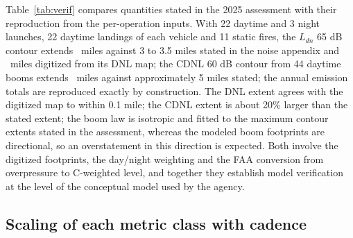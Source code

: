 \documentclass[preprint,12pt,authoryear]{elsarticle}
\begin{document}
Table~\ref{tab:verif} compares quantities stated in the 2025 assessment with their reproduction from the per-operation inputs. With 22 daytime and 3 night launches, 22 daytime landings of each vehicle and 11 static fires, the $L_{dn}$ 65 dB contour extends \valVerifDnlSixFiveDbContourExtentMiles~miles against 3 to 3.5 miles stated in the noise appendix and \valVerifDnlSixFiveDbOverlandContourRadiusDigitizedFigureTwoOneMiles~miles digitized from its DNL map; the CDNL 60 dB contour from 44 daytime booms extends \valVerifCdnlSixZeroDbContourExtentMiles~miles against approximately 5 miles stated; the annual emission totals are reproduced exactly by construction. The DNL extent agrees with the digitized map to within 0.1 mile; the CDNL extent is about 20\% larger than the stated extent; the boom law is isotropic and fitted to the maximum contour extents stated in the assessment, whereas the modeled boom footprints are directional, so an overstatement in this direction is expected. Both involve the digitized footprints, the day/night weighting and the FAA conversion from overpressure to C-weighted level, and together they establish model verification at the level of the conceptual model used by the agency.

\begin{table}[htbp]
\caption{Verification against values stated in the 2025 Tiered Environmental Assessment.}
\label{tab:verif}
\centering\footnotesize
\tableVerification
\end{table}

\subsection{Scaling of each metric class with cadence}
\end{document}
